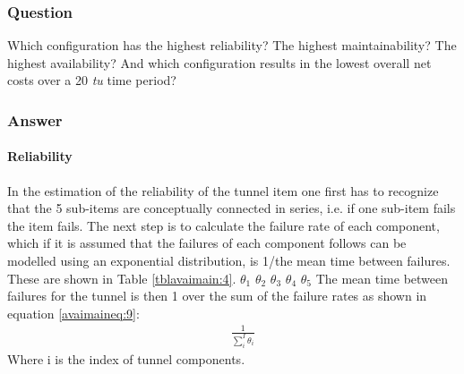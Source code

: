 \subsubsection{Question}
Which configuration has the highest reliability? The highest maintainability?
The highest availability? And which configuration results in the lowest overall
net costs over a 20 \textit{tu} time period?
\subsubsection{Answer}
\paragraph{Reliability}
In the estimation of the reliability of the tunnel item one first has to
recognize that the 5 sub-items are conceptually connected in series, i.e. if one
sub-item fails the item fails. The next step is to calculate the failure rate of
each component, which if it is assumed that the failures of each component
follows can be modelled using an exponential distribution, is 1/the mean time
between failures. These are shown in Table \ref{tblavaimain:4}.
${\theta _1}$ ${\theta _2}$ ${\theta _3}$ ${\theta _4}$ ${\theta _5}$
The mean time between failures for the tunnel is then 1 over the sum of the
failure rates as shown in equation \eqref{avaimaineq:9}:
\begin{eqnarray}
&& \frac{1}{{\sum\limits_i^I {{\theta _i}} }}
\label{avaimaineq:9}
\end{eqnarray}
Where i is the index of tunnel components.

